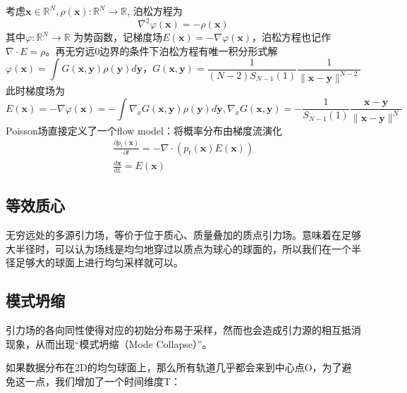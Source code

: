 \documentclass{article}
\newcommand{\tmmathbf}[1]{\ensuremath{\boldsymbol{#1}}}
\newcommand{\tmop}[1]{\ensuremath{\operatorname{#1}}}
\begin{document}
\begin{CJK*}{UTF8}{gbsn}
考虑$\tmmathbf{x} \in \mathbb{R}^N, \rho (\tmmathbf{x}) : \mathbb{R}^N
\rightarrow \mathbb{R}$, 泊松方程为
\[ \nabla^2 \varphi (\tmmathbf{x}) = - \rho (\tmmathbf{x}) \]
其中$\varphi : \mathbb{R}^N \rightarrow \mathbb{R}$
为势函数，记梯度场$E (\tmmathbf{x}) = - \nabla \varphi
(\tmmathbf{x})$，泊松方程也记作$\nabla \cdot E =
\rho$。再无穷远0边界的条件下泊松方程有唯一积分形式解
\[ \varphi (\tmmathbf{x}) = \int G (\tmmathbf{x}, \tmmathbf{y}) \rho
   (\tmmathbf{y}) d\tmmathbf{y}，G (\tmmathbf{x}, \tmmathbf{y}) = \frac{1}{(N
   - 2) S_{N - 1} (1)} \frac{1}{\| \tmmathbf{x}-\tmmathbf{y} \|^{N - 2}} \]
此时梯度场为
\[ E (\tmmathbf{x}) = - \nabla \varphi (\tmmathbf{x}) = - \int \nabla_x G
   (\tmmathbf{x}, \tmmathbf{y}) \rho (\tmmathbf{y}) d\tmmathbf{y}, \nabla_x G
   (\tmmathbf{x}, \tmmathbf{y}) = - \frac{1}{S_{N - 1} (1)}
   \frac{\tmmathbf{x}-\tmmathbf{y}}{\| \tmmathbf{x}-\tmmathbf{y} \|^N} \]
Poisson场直接定义了一个flow model：将概率分布由梯度流演化
\[ \begin{array}{c}
     \frac{\partial p_t (\tmmathbf{x})}{\partial t} = - \nabla \cdot (p_t
     (\tmmathbf{x}) E (\tmmathbf{x}))\\
     \frac{d\tmmathbf{x}}{\tmop{dt}} = E (\tmmathbf{x})
   \end{array} \]

\subsection{等效质心}

无穷远处的多源引力场，等价于位于质心、质量叠加的质点引力场。意味着在足够大半径时，可以认为场线是均匀地穿过以质点为球心的球面的，所以我们在一个半径足够大的球面上进行均匀采样就可以。


\subsection{模式坍缩}

引力场的各向同性使得对应的初始分布易于采样，然而也会造成引力源的相互抵消现象，从而出现“模式坍缩（Mode
Collapse）”。


如果数据分布在2D的均匀球面上，那么所有轨道几乎都会来到中心点O，为了避免这一点，我们增加了一个时间维度T：


\end{CJK*}
\end{document}
